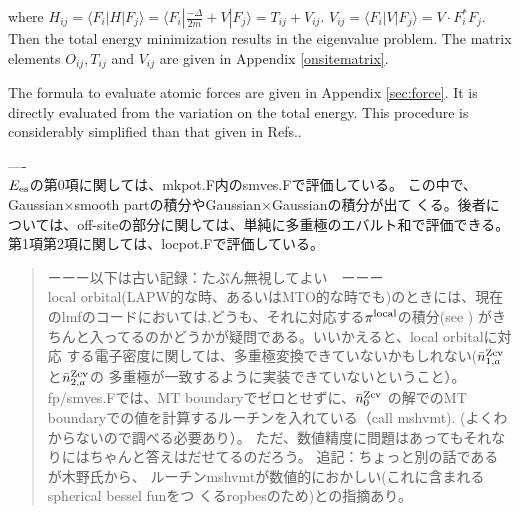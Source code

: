 \documentclass[twocolumn,showpacs,preprintnumbers,amsmath,amssymb,floatfix]{revtex4-1}
\newcommand{\ooplus}{\oplus}
\newcommand{\oominus}{\ominus}
\newcommand{\req}[1]{\mbox{Eq.~\!(\ref{#1})}}
\def\barnzcv{\bar{n}^{\rm Zcv}}
\def\barnzcv{\bar{n}^{\rm Zcv}}
\begin{document}
where $H_{ij}= \langle F_i| H |F_{j} \rangle = 
\langle F_i| \frac{-\Delta}{2m} + V |F_{j} \rangle =T_{ij}+V_{ij}$.
$V_{ij}=\langle F_i|V|F_{j} \rangle=V \cdot F^*_i F_j$. 
Then the total energy minimization results in the eigenvalue problem.
The matrix elements $O_{ij},T_{ij}$
and $V_{ij}$ are given in Appendix \ref{onsitematrix}.

The formula to evaluate atomic forces are given in Appendix
\ref{sec:force}. It is directly evaluated from the variation on the
total energy. This procedure is considerably simplified than that given
in Refs.\cite{lmfchap,molforce}. 


----\\
$E_{\rm es}$の第0項に関しては、mkpot.F内のsmves.Fで評価している。
この中で、Gaussian$\times$smooth partの積分やGaussian$\times$Gaussianの積分が出て
くる。後者については、off-siteの部分に関しては、単純に多重極のエバルト和で評価できる。
第1項第2項に関しては、locpot.Fで評価している。


\begin{quote}
ーーー以下は古い記録：たぶん無視してよい　ーーー\\
local orbital(LAPW的な時、あるいはMTO的な時でも)のときには、現在
のlmfのコードにおいては,どうも、それに対応する$\pi^{\rm local}$の積分(see \cite{lmfchap})
がきちんと入ってるのかどうかが疑問である。いいかえると、local orbitalに対応
する電子密度に関しては、多重極変換できていないかもしれない($\barnzcv_{1,a}$と$\barnzcv_{2,a}$の
多重極が一致するように実装できていないということ）。
fp/smves.Fでは、MT boundaryでゼロとせずに、$\barnzcv_0$
の解でのMT boundaryでの値を計算するルーチンを入れている（call mshvmt).
(よくわからないので調べる必要あり）。
ただ、数値精度に問題はあってもそれなりにはちゃんと答えはだせてるのだろう。
追記：ちょっと別の話であるが木野氏から、
ルーチンmshvmtが数値的におかしい(これに含まれるspherical bessel funをつ
くるropbesのため)との指摘あり。
\end{quote}

\end{document}
